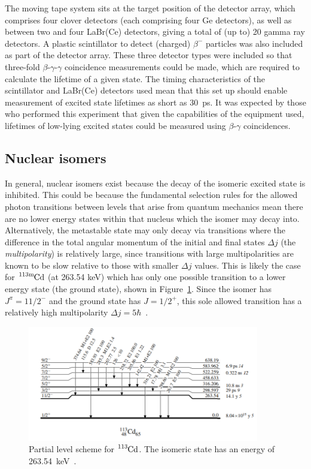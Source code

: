 \documentclass[12pt,a4paper]{article}
\newcommand{\cdm}{\ce{^{113\text{m}}Cd}}
\begin{document}
\medskip
\noindent
The moving tape system sits at the target position of the detector array, which comprises four clover detectors (each comprising four Ge detectors), as well as between two and four LaBr(Ce) detectors, giving a total of (up to) 20 gamma ray detectors.
A plastic scintillator to detect (charged) $\beta^-$ particles was also included as part of the detector array.
These three detector types were included so that three-fold $\beta$-$\gamma$-$\gamma$ coincidence measurements could be made, which are required to calculate the lifetime of a given state.
The timing characteristics of the scintillator and LaBr(Ce) detectors used mean that this set up should enable measurement of excited state lifetimes as short as 30~ps.
It was expected by those who performed this experiment that given the capabilities of the equipment used, lifetimes of low-lying excited states could be measured using $\beta$-$\gamma$ coincidences.


\subsection*{Nuclear isomers}
In general, nuclear isomers exist because the decay of the isomeric excited state is inhibited.
This could be because the fundamental selection rules for the allowed photon transitions between levels that arise from quantum mechanics mean there are no lower energy states within that nucleus which the isomer may decay into.
Alternatively, the metastable state may only decay via transitions where the difference in the total angular momentum of the initial and final states $\Delta j$ (the \textit{multipolarity}) is relatively large, since transitions with large multipolarities are known to be slow relative to those with smaller $\Delta j$ values.
This is likely the case for $\cdm$ (at 263.54 keV) which has only one possible transition to a lower energy state (the ground state), shown in Figure~\ref{fig:cd113}.
Since the isomer has $J^\pi = 11/2^-$ and the ground state has $J = 1/2^+$, this sole allowed transition has a relatively high multipolarity $\Delta j = 5\hbar$~\cite{blachot_notitle_111}.
\begin{figure}[htbp]
	\centering
	\includegraphics[width=0.9\textwidth]{113cd_partial_level_scheme_ENSDF.png}
	\caption{Partial level scheme for $\ce{^{113}Cd}$. The isomeric state has an energy of 263.54~keV~\cite{blachot_notitle_111}.}
\label{fig:cd113}
\end{figure}
\end{document}

